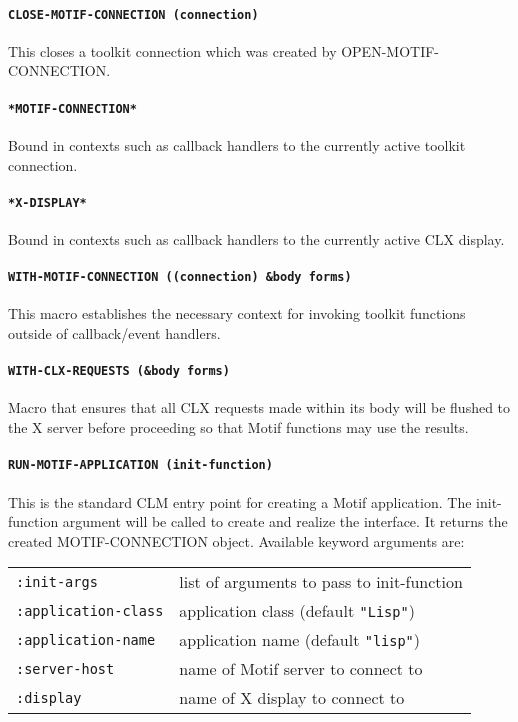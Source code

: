 \documentclass[a4paper]{article}
\begin{document}
\paragraph{\texttt{CLOSE-MOTIF-CONNECTION (connection)}} This closes a toolkit
connection which was created by OPEN-MOTIF-CONNECTION.

\paragraph{\texttt{*MOTIF-CONNECTION*}} Bound in contexts such as
callback handlers to the currently active toolkit connection.

\paragraph{\texttt{*X-DISPLAY*}} Bound in contexts such as callback
handlers to the currently active CLX display.

\paragraph{\texttt{WITH-MOTIF-CONNECTION ((connection) \&body forms)}}
This macro establishes the necessary context for invoking toolkit
functions outside of callback/event handlers.

\paragraph{\texttt{WITH-CLX-REQUESTS (\&body forms)}} Macro that ensures
that all CLX requests made within its body will be flushed to the X
server before proceeding so that Motif functions may use the results.

\paragraph{\texttt{RUN-MOTIF-APPLICATION (init-function)}} This is the
standard CLM entry point for creating a Motif application.  The
init-function argument will be called to create and realize the
interface.  It returns the created MOTIF-CONNECTION object.  Available
keyword arguments are:\\[2mm]
\begin{tabular}{ll}
\texttt{:init-args}		& list of arguments to pass to init-function\\
\texttt{:application-class}	& application class (default \texttt{"Lisp"})\\
\texttt{:application-name}	& application name (default \texttt{"lisp"})\\
\texttt{:server-host}		& name of Motif server to connect to\\
\texttt{:display}		& name of X display to connect to
\end{tabular}
\end{document}

